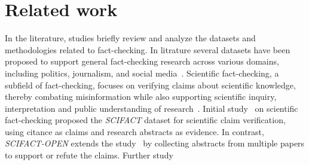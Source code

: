 \section{Related work}
In the literature, studies\cite{guo2022survey,vladika2023scientific} briefly review and analyze the datasets and methodologies related to fact-checking. In litrature several datasets have been proposed to support general fact-checking research across various domains, including politics, journalism, and social media~\cite{vlachos2014fact,popat2017truth,thorne2018fever,thorne2018fact,alhindi2018your,chen2019seeing,hanselowski2019richly,augenstein2019multifc,atanasova2024multi,sathe2020automated,saakyan2021covid,schuster2021get,aly2021feverous}.
Scientific fact-checking, a subfield of fact-checking, focuses on verifying claims about scientific knowledge, thereby combating misinformation while also supporting scientific inquiry, interpretation and public understanding of research~\cite{vladika2023scientific}. Initial  study~\cite{wadden2020fact} on scientific fact-checking proposed the \textit{SCIFACT} dataset for scientific claim verification, using citance as claims and research abstracts as evidence. In contrast, \textit{SCIFACT-OPEN}\cite{wadden2022scifact} extends the study~\cite{wadden2020fact} by collecting abstracts from multiple papers to support or refute the claims. Further study~\cite{wright2022generating} 
